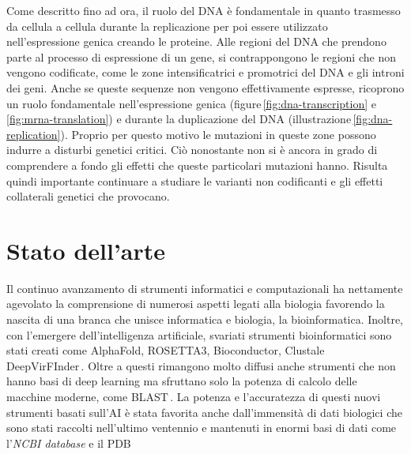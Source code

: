 Come descritto fino ad ora, il ruolo del DNA è fondamentale in quanto trasmesso da cellula a cellula durante la replicazione per poi essere utilizzato nell'espressione genica creando le proteine. Alle regioni del DNA che prendono parte al processo di espressione di un gene, si contrappongono le regioni che non vengono codificate, come le zone intensificatrici e promotrici del DNA e gli introni dei geni. Anche se queste sequenze non vengono effettivamente espresse, ricoprono un ruolo fondamentale nell'espressione genica (figure\,\ref{fig:dna-transcription} e\,\ref{fig:mrna-translation}) e durante la duplicazione del DNA (illustrazione\,\ref{fig:dna-replication}). Proprio per questo motivo le mutazioni in queste zone possono indurre a disturbi genetici critici. Ciò nonostante non si è ancora in grado di comprendere a fondo gli effetti che queste particolari mutazioni hanno. Risulta quindi importante continuare a studiare le varianti non codificanti e gli effetti collaterali genetici che provocano.







\section{Stato dell'arte}

Il continuo avanzamento di strumenti informatici e computazionali ha nettamente agevolato la comprensione di numerosi aspetti legati alla biologia favorendo la nascita di una branca che unisce informatica e biologia, la bioinformatica. Inoltre, con l'emergere dell'intelligenza artificiale, svariati strumenti bioinformatici sono stati creati come AlphaFold, ROSETTA3, Bioconductor, Clustale  DeepVirFInder\,\cite{jumper2021highly, leaver2011rosetta3, gentleman2004bioconductor, larkin2007clustal, ren2020identifying}. Oltre a questi rimangono molto diffusi anche strumenti che non hanno basi di deep learning ma sfruttano solo la potenza di calcolo delle macchine moderne, come BLAST\,\cite{altschul1990basic}. La potenza e l'accuratezza di questi nuovi strumenti basati sull'AI è stata favorita anche dall'immensità di dati biologici che sono stati raccolti nell'ultimo ventennio e mantenuti in enormi basi di dati come l'\textit{NCBI database} e il PDB\,\cite{sherry2001dbsnp, burley2017protein}

